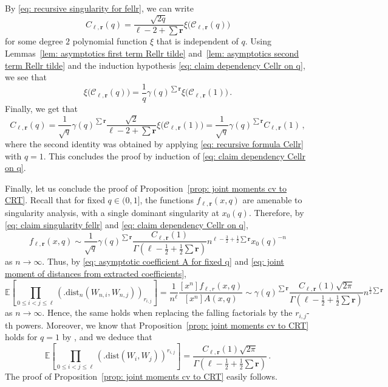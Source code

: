 \documentclass{article}
\theoremstyle{remark}
\newcommand{\dist}{\mathrm{dist}}
\newcommand{\cC}{\mathcal{C}}
\newcommand{\br}{{\mathbf{r}}}
\newcommand{\expec}[1]{\mathbb{E}{\left[#1\right]}}
\begin{document}
By \eqref{eq: recursive singularity for fellr}, we can write
\begin{equation}\label{eq: recursive formula Cellr}
    C_{\ell,\br}(q) = \frac{\sqrt{2q}}{\ell-2+\sum\br} \xi\big( \cC_{\ell, \br}(q) \big)
\end{equation}
for some degree $2$ polynomial function $\xi$ that is independent of $q$.
Using Lemmas~\ref{lem: asymptotics first term Rellr tilde} and~\ref{lem: asymptotics second term Rellr tilde} and the induction hypothesis \eqref{eq: claim dependency Cellr on q}, we see that
\begin{equation*}
    \xi\big( \cC_{\ell, \br}(q) \big) = \frac1q \gamma(q)^{\sum\br} \xi\big( \cC_{\ell, \br}(1) \big) \,.
\end{equation*}
Finally, we get that
\begin{equation*}
    C_{\ell,\br}(q) 
    = \frac{1}{\sqrt q} \gamma(q)^{\sum\br} \frac{\sqrt{2}}{\ell-2+\sum\br} \xi\big( \cC_{\ell, \br}(1) \big)
    = \frac{1}{\sqrt q} \gamma(q)^{\sum\br} C_{\ell,\br}(1) \,,
\end{equation*}
where the second identity was obtained by applying \eqref{eq: recursive formula Cellr} with $q=1$.
This concludes the proof by induction of \eqref{eq: claim dependency Cellr on q}.

\medskip

Finally, let us conclude the proof of Proposition~\ref{prop: joint moments cv to CRT}.
Recall that for fixed $q\in(0,1]$, the functions $f_{\ell,\br}(x,q)$ are amenable to singularity analysis, with a single dominant singularity at $x_0(q)$.
Therefore, by \eqref{eq: claim singularity fellr} and \eqref{eq: claim dependency Cellr on q},
\begin{equation*}
    [x^n] f_{\ell,\br}(x,q) \sim \frac{1}{\sqrt q} \gamma(q)^{\sum\br} \frac{C_{\ell,\br}(1)}{\Gamma(\ell-\frac12+\frac12\sum\br)} n^{\ell-\frac32+\frac12\sum\br} x_0(q)^{-n}
\end{equation*}
as $n\to\infty$.
Thus, by \eqref{eq: asymptotic coefficient A for fixed q} and \eqref{eq: joint moment of distances from extracted coefficients},
\begin{equation*}
    \expec{ \prod_{0\le i< j\le \ell} \left(\big. \dist_n(W_{n,i},W_{n,j}) \right)_{r_{i,j}} }
    = \frac{1}{n^\ell} \frac{[x^n]f_{\ell,r}(x,q)}{[x^n]A(x,q)}
    \sim \gamma(q)^{\sum \br} \frac{ C_{\ell,\br}(1) \sqrt{2\pi} }{ \Gamma\left(\ell -\frac12 + \frac12\sum \br\right) } n^{\frac12\sum \br}
\end{equation*}
as $n\to\infty$.
Hence, the same holds when replacing the falling factorials by the $r_{i,j}$-th powers.
Moreover, we know that Proposition~\ref{prop: joint moments cv to CRT} holds for $q=1$ by \cite{Aldous_1993}, and we deduce that
\begin{equation*}
    \expec{ \prod_{0\le i< j\le \ell} \left(\big. \dist(W_{i},W_{j}) \right)^{r_{i,j}} }
    = \frac{ C_{\ell,\br}(1) \sqrt{2\pi} }{ \Gamma\left(\ell -\frac12 + \frac12\sum \br\right) } \,.
\end{equation*}
The proof of Proposition~\ref{prop: joint moments cv to CRT} easily follows.
\end{document}
